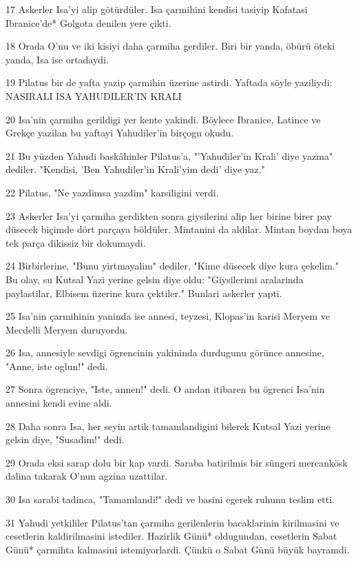 \par 17 Askerler Isa'yi alip götürdüler. Isa çarmihini kendisi tasiyip Kafatasi Ibranice'de* Golgota denilen yere çikti.
\par 18 Orada O'nu ve iki kisiyi daha çarmiha gerdiler. Biri bir yanda, öbürü öteki yanda, Isa ise ortadaydi.
\par 19 Pilatus bir de yafta yazip çarmihin üzerine astirdi. Yaftada söyle yaziliydi: NASIRALI ISA YAHUDILER'IN KRALI
\par 20 Isa'nin çarmiha gerildigi yer kente yakindi. Böylece Ibranice, Latince ve Grekçe yazilan bu yaftayi Yahudiler'in birçogu okudu.
\par 21 Bu yüzden Yahudi baskâhinler Pilatus'a, "'Yahudiler'in Krali' diye yazma" dediler. "Kendisi, 'Ben Yahudiler'in Krali'yim dedi' diye yaz."
\par 22 Pilatus, "Ne yazdimsa yazdim" karsiligini verdi.
\par 23 Askerler Isa'yi çarmiha gerdikten sonra giysilerini alip her birine birer pay düsecek biçimde dört parçaya böldüler. Mintanini da aldilar. Mintan boydan boya tek parça dikissiz bir dokumaydi.
\par 24 Birbirlerine, "Bunu yirtmayalim" dediler, "Kime düsecek diye kura çekelim." Bu olay, su Kutsal Yazi yerine gelsin diye oldu: "Giysilerimi aralarinda paylastilar, Elbisem üzerine kura çektiler." Bunlari askerler yapti.
\par 25 Isa'nin çarmihinin yaninda ise annesi, teyzesi, Klopas'in karisi Meryem ve Mecdelli Meryem duruyordu.
\par 26 Isa, annesiyle sevdigi ögrencinin yakininda durdugunu görünce annesine, "Anne, iste oglun!" dedi.
\par 27 Sonra ögrenciye, "Iste, annen!" dedi. O andan itibaren bu ögrenci Isa'nin annesini kendi evine aldi.
\par 28 Daha sonra Isa, her seyin artik tamamlandigini bilerek Kutsal Yazi yerine gelsin diye, "Susadim!" dedi.
\par 29 Orada eksi sarap dolu bir kap vardi. Saraba batirilmis bir süngeri mercankösk dalina takarak O'nun agzina uzattilar.
\par 30 Isa sarabi tadinca, "Tamamlandi!" dedi ve basini egerek ruhunu teslim etti.
\par 31 Yahudi yetkililer Pilatus'tan çarmiha gerilenlerin bacaklarinin kirilmasini ve cesetlerin kaldirilmasini istediler. Hazirlik Günü* oldugundan, cesetlerin Sabat Günü* çarmihta kalmasini istemiyorlardi. Çünkü o Sabat Günü büyük bayramdi.
